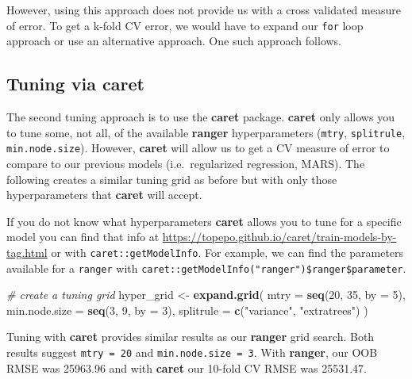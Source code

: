 \documentclass[]{book}
\newenvironment{Shaded}{\begin{snugshade}}{\end{snugshade}}
\newcommand{\CommentTok}[1]{\textcolor[rgb]{0.56,0.35,0.01}{\textit{#1}}}
\newcommand{\DataTypeTok}[1]{\textcolor[rgb]{0.13,0.29,0.53}{#1}}
\newcommand{\DecValTok}[1]{\textcolor[rgb]{0.00,0.00,0.81}{#1}}
\newcommand{\KeywordTok}[1]{\textcolor[rgb]{0.13,0.29,0.53}{\textbf{#1}}}
\newcommand{\NormalTok}[1]{#1}
\newcommand{\StringTok}[1]{\textcolor[rgb]{0.31,0.60,0.02}{#1}}
\theoremstyle{definition}
\theoremstyle{definition}
\theoremstyle{definition}
\theoremstyle{remark}
\begin{document}
However, using this approach does not provide us with a cross validated
measure of error. To get a k-fold CV error, we would have to expand our
\texttt{for} loop approach or use an alternative approach. One such
approach follows.

\hypertarget{tuning-via-caret}{%
\subsection{Tuning via caret}\label{tuning-via-caret}}

The second tuning approach is to use the \textbf{caret} package.
\textbf{caret} only allows you to tune some, not all, of the available
\textbf{ranger} hyperparameters (\texttt{mtry}, \texttt{splitrule},
\texttt{min.node.size}). However, \textbf{caret} will allow us to get a
CV measure of error to compare to our previous models (i.e.~regularized
regression, MARS). The following creates a similar tuning grid as before
but with only those hyperparameters that \textbf{caret} will accept.

\begin{tip}
If you do not know what hyperparameters \textbf{caret} allows you to
tune for a specific model you can find that info at
\url{https://topepo.github.io/caret/train-models-by-tag.html} or with
\texttt{caret::getModelInfo}. For example, we can find the parameters
available for a \texttt{ranger} with
\texttt{caret::getModelInfo("ranger")\$ranger\$parameter}.
\end{tip}

\begin{Shaded}
\begin{Highlighting}[]
\CommentTok{# create a tuning grid}
\NormalTok{hyper_grid <-}\StringTok{ }\KeywordTok{expand.grid}\NormalTok{(}
  \DataTypeTok{mtry            =} \KeywordTok{seq}\NormalTok{(}\DecValTok{20}\NormalTok{, }\DecValTok{35}\NormalTok{, }\DataTypeTok{by =} \DecValTok{5}\NormalTok{),}
  \DataTypeTok{min.node.size   =} \KeywordTok{seq}\NormalTok{(}\DecValTok{3}\NormalTok{, }\DecValTok{9}\NormalTok{, }\DataTypeTok{by =} \DecValTok{3}\NormalTok{),}
  \DataTypeTok{splitrule       =} \KeywordTok{c}\NormalTok{(}\StringTok{"variance"}\NormalTok{, }\StringTok{"extratrees"}\NormalTok{)}
\NormalTok{  )}
\end{Highlighting}
\end{Shaded}

Tuning with \textbf{caret} provides similar results as our
\textbf{ranger} grid search. Both results suggest \texttt{mtry\ =\ 20}
and \texttt{min.node.size\ =\ 3}. With \textbf{ranger}, our OOB RMSE was
25963.96 and with \textbf{caret} our 10-fold CV RMSE was 25531.47.
\end{document}
